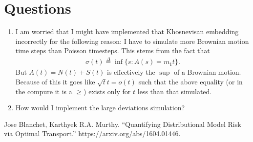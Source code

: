 \documentclass[12pt]{article}
\newcommand{\define}{\overset{\Delta}{=}}
\theoremstyle{definition}
\theoremstyle{definition}
\theoremstyle{definition}
\begin{document}
\section*{Questions}
\begin{enumerate}
\item I am worried that I might have implemented that Khosnevisan embedding incorrectly for the following reason: I have to simulate more Brownian motion time steps than Poisson timesteps. This stems from the fact that 
\begin{align*}
\sigma(t)\define\inf\{s: A(s)=m_1t\}.
\end{align*}
But $A(t)=N(t)+S(t)$ is effectively the $\sup$ of a Brownian motion. Because of this it goes like $\sqrt{t}t=o(t)$ such that the above equality (or in the compure it is a $\geq$) exists only for $t$ less than that simulated.

\item How would I implement the large deviations simulation?


\end{enumerate}

\begin{thebibliography}{9}
 Jose Blanchet, Karthyek R.A. Murthy. ``Quantifying Distributional Model Risk via Optimal Transport.'' https://arxiv.org/abs/1604.01446.
\end{thebibliography}
\end{document}
